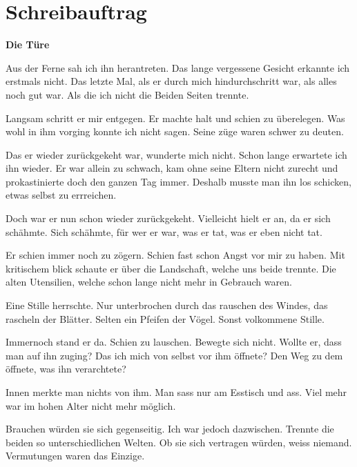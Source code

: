 \documentclass{article}
\begin{document}
\section{Schreibauftrag}
\textbf{Die Türe}
\begin{multicols}{2}
    Aus der Ferne sah ich ihn herantreten. Das lange vergessene Gesicht erkannte ich erstmals nicht. Das letzte Mal, als er durch mich hindurchschritt war, als alles noch gut war. Als die ich nicht die Beiden Seiten trennte.
    
    Langsam schritt er mir entgegen. Er machte halt und schien zu überelegen. Was wohl in ihm vorging konnte ich nicht sagen. Seine züge waren schwer zu deuten.

    Das er wieder zurückgekeht war, wunderte mich nicht. Schon lange erwartete ich ihn wieder. Er war allein zu schwach, kam ohne seine Eltern nicht zurecht und prokastinierte doch den ganzen Tag immer. Deshalb musste man ihn los schicken, etwas selbst zu errreichen.

    Doch war er nun schon wieder zurückgekeht. Vielleicht hielt er an, da er sich schähmte. Sich schähmte, für wer er war, was er tat, was er eben nicht tat.

    Er schien immer noch zu zögern. Schien fast schon Angst vor mir zu haben. Mit kritischem blick schaute er über die Landschaft, welche uns beide trennte. Die alten Utensilien, welche schon lange nicht mehr in Gebrauch waren.

    Eine Stille herrschte. Nur unterbrochen durch das rauschen des Windes, das rascheln der Blätter. Selten ein Pfeifen der Vögel. Sonst volkommene Stille.

    Immernoch stand er da. Schien zu lauschen. Bewegte sich nicht. Wollte er, dass man auf ihn zuging? Das ich mich von selbst vor ihm öffnete? Den Weg zu dem öffnete, was ihn verarchtete?

    Innen merkte man nichts von ihm. Man sass nur am Esstisch und ass. Viel mehr war im hohen Alter nicht mehr möglich.

    Brauchen würden sie sich gegenseitig. Ich war jedoch dazwischen. Trennte die beiden so unterschiedlichen Welten. Ob sie sich vertragen würden, weiss niemand. Vermutungen waren das Einzige.
\end{multicols}
\end{document}
